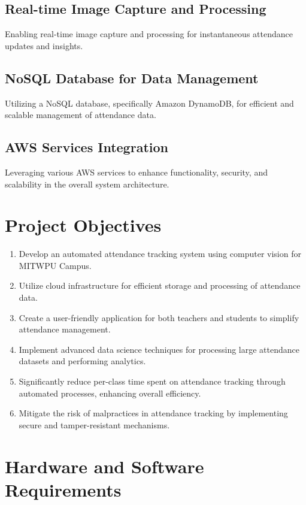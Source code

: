 \documentclass[11pt]{article}
\begin{document}
\subsection{Real-time Image Capture and Processing}
Enabling real-time image capture and processing for instantaneous attendance updates and insights.

\subsection{NoSQL Database for Data Management}
Utilizing a NoSQL database, specifically Amazon DynamoDB, for efficient and scalable management of attendance data.

\subsection{AWS Services Integration}
Leveraging various AWS services to enhance functionality, security, and scalability in the overall system architecture.
\section{Project Objectives}
\begin{enumerate}
    \item Develop an automated attendance tracking system using computer vision for MITWPU Campus.
    
    \item Utilize cloud infrastructure for efficient storage and processing of attendance data.

    \item Create a user-friendly application for both teachers and students to simplify attendance management.

    \item Implement advanced data science techniques for processing large attendance datasets and performing analytics.

    \item Significantly reduce per-class time spent on attendance tracking through automated processes, enhancing overall efficiency.

    \item Mitigate the risk of malpractices in attendance tracking by implementing secure and tamper-resistant mechanisms.
\end{enumerate}

\section{Hardware and Software Requirements}
\end{document}
